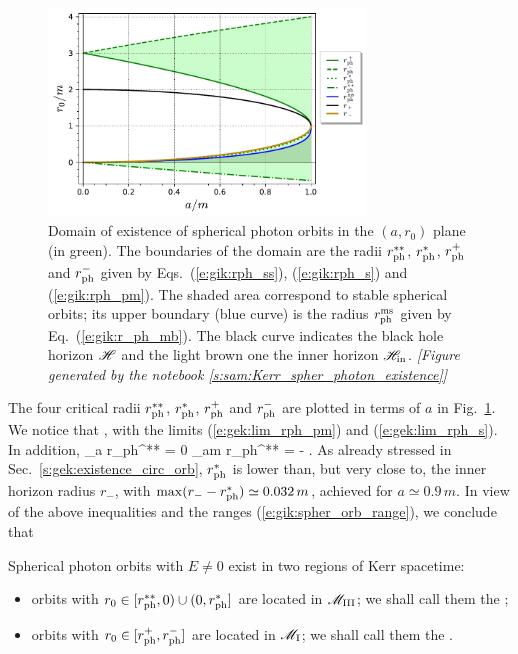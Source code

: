 \begin{figure}
\centerline{\includegraphics[width=0.75\textwidth]{gik_spher_orb_range.pdf}}
\caption[]{\label{f:gik:spher_orb_range} \footnotesize
Domain of existence of spherical photon orbits in the $(a, r_0)$ plane
(in green). The boundaries of the domain are the radii
$r_{\rm ph}^{**}$, $r_{\rm ph}^*$, $r_{\rm ph}^+$ and $r_{\rm ph}^-$
given by Eqs.~(\ref{e:gik:rph_ss}), (\ref{e:gik:rph_s}) and (\ref{e:gik:rph_pm}).
The shaded area correspond to stable spherical orbits; its upper boundary
(blue curve)
is the radius $r_{\rm ph}^{\rm ms}$ given by Eq.~(\ref{e:gik:r_ph_mb}).
The black curve indicates the black hole horizon $\mathscr{H}$ and the light brown one
the inner horizon $\mathscr{H}_{\rm in}$.
\textsl{[Figure generated by the notebook \ref{s:sam:Kerr_spher_photon_existence}]}
}
\end{figure}

The four critical radii $r_{\rm ph}^{**}$, $r_{\rm ph}^*$, $r_{\rm ph}^+$ and $r_{\rm ph}^-$
are plotted in terms of $a$ in Fig.~\ref{f:gik:spher_orb_range}. We notice that
\be \label{e:gik:r_crit_order}
  ,
\ee
with the limits (\ref{e:gek:lim_rph_pm}) and (\ref{e:gek:lim_rph_s}). In addition,
\be
    \lim_{a} r_{\rm ph}^{**} = 0 \qand
    \lim_{a\to m} r_{\rm ph}^{**} = -  .
\ee
As already stressed in Sec.~\ref{s:gek:existence_circ_orb}, $r_{\rm ph}^*$ is lower than, but very close to,
the inner horizon radius $r_{-}$, with  $\max (r_- - r_{\rm ph}^*) \simeq 0.032 \, m$,
achieved for $a\simeq 0.9 \, m$.
In view of the above inequalities and the ranges (\ref{e:gik:spher_orb_range}), we conclude that
\begin{greybox}
Spherical photon orbits with $E\neq 0$ exist in two regions of Kerr spacetime:
\begin{itemize}
\item orbits with $r_0\in [r_{\rm ph}^{**}, 0) \cup (0, r_{\rm ph}^*]$ are located in $\mathscr{M}_{\rm III}$;
we shall call them the ;
\item orbits with $r_0 \in [r_{\rm ph}^+, r_{\rm ph}^-]$ are located in $\mathscr{M}_{\rm I}$;
we shall call them the .
\end{itemize}
\end{greybox}

